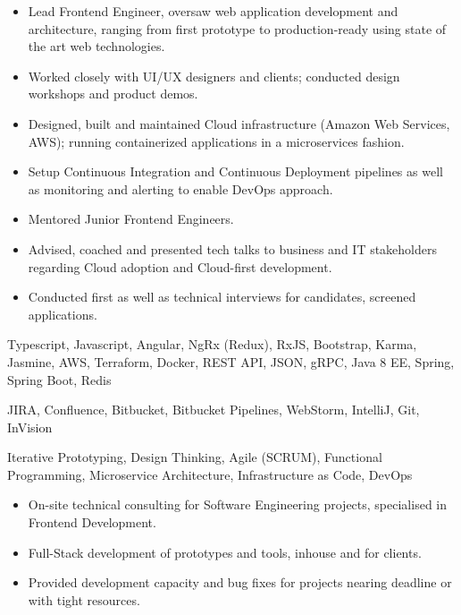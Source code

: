 
\medskip
\begin{itemize}
	\item Lead Frontend Engineer, oversaw web application development and architecture, ranging from first prototype to production-ready using state of the art web technologies.
	\item Worked closely with UI/UX designers and clients; conducted design workshops and product demos.
	\item Designed, built and maintained Cloud infrastructure (Amazon Web Services, AWS); running containerized applications in a microservices fashion.
	\item Setup Continuous Integration and Continuous Deployment pipelines as well as monitoring and alerting to enable DevOps approach.
	\item Mentored Junior Frontend Engineers.
	\item Advised, coached and presented tech talks to business and IT stakeholders regarding Cloud adoption and Cloud-first development.
	\item Conducted first as well as technical interviews for candidates, screened applications.
\end{itemize}

\medskip
\begin{description}
	\ifincludestech
	\item [Technologies] Typescript, Javascript, Angular, NgRx (Redux), RxJS, Bootstrap, Karma, Jasmine, AWS, Terraform, Docker, REST API, JSON, gRPC, Java 8 EE, Spring, Spring Boot, Redis
	\fi
	\ifincludestools
	\item [Tools] JIRA, Confluence, Bitbucket, Bitbucket Pipelines, WebStorm, IntelliJ, Git, InVision
	\fi
	\ifincludesmethods
	\item [Methodologies] Iterative Prototyping, Design Thinking, Agile (SCRUM), Functional Programming, Microservice Architecture, Infrastructure as Code, DevOps
	\fi
\end{description}

\divider


\medskip
\begin{itemize}
	\item On-site technical consulting for Software Engineering projects, specialised in Frontend Development.
	\item Full-Stack development of prototypes and tools, inhouse and for clients.
	\item Provided development capacity and bug fixes for projects nearing deadline or with tight resources.
\end{itemize}


